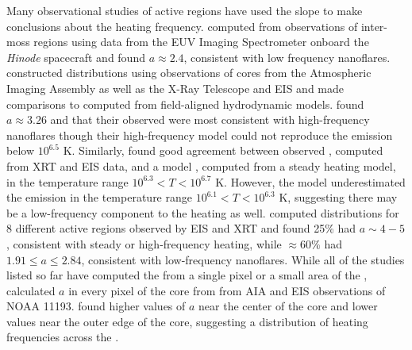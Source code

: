Many observational studies of active regions have used the \dem{} slope to make conclusions about the heating frequency. \citet{tripathi_emission_2011} computed \dem{} from observations of inter-moss regions using data from the EUV Imaging Spectrometer \citep[EIS][]{culhane_euv_2007} onboard the \textit{Hinode} spacecraft \citep{kosugi_hinode_2007} and found $a\approx2.4$, consistent with low frequency nanoflares. \citet{warren_constraints_2011} constructed \dem{} distributions using observations of \AR{} cores from the Atmospheric Imaging Assembly \citep[AIA][]{lemen_atmospheric_2012} as well as the X-Ray Telescope \citep[XRT][]{golub_x-ray_2007} and EIS and made comparisons to \dem{} computed from field-aligned hydrodynamic models. \citeauthor{warren_constraints_2011} found $a\approx3.26$ and that their observed \dem{} were most consistent with high-frequency nanoflares though their high-frequency model could not reproduce the emission below $10^{6.5}$ K. Similarly, \citet{winebarger_using_2011} found good agreement between observed \dem{}, computed from XRT and EIS data, and a model \dem{}, computed from a steady heating model, in the temperature range $10^{6.3}<T<10^{6.7}$ K. However, the model \dem{} underestimated the emission in the temperature range $10^{6.1}<T<10^{6.3}$ K, suggesting there may be a low-frequency component to the heating as well. \citet{schmelz_cold_2012} computed \dem{} distributions for 8 different active regions observed by EIS and XRT and found 25\% had $a\sim4-5$, consistent with steady or high-frequency heating, while $\approx60\%$ had $1.91\le a\le2.84$, consistent with low-frequency nanoflares. While all of the studies listed so far have computed the \dem{} from a single pixel or a small area of the \AR{}, \citet{del_zanna_evolution_2015} calculated $a$ in every pixel of the \AR{} core from from AIA and EIS observations of NOAA 11193. \citeauthor{del_zanna_evolution_2015} found higher values of $a$ near the center of the core and lower values near the outer edge of the core, suggesting a distribution of heating frequencies across the \AR{}.

